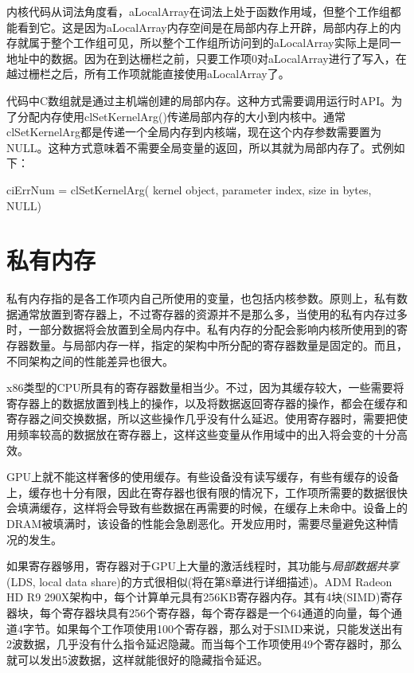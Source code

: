 内核代码从词法角度看，aLocalArray在词法上处于函数作用域，但整个工作组都能看到它。这是因为aLocalArray内存空间是在局部内存上开辟，局部内存上的内存就属于整个工作组可见，所以整个工作组所访问到的aLocalArray实际上是同一地址中的数据。因为在到达栅栏之前，只要工作项0对aLocalArray进行了写入，在越过栅栏之后，所有工作项就能直接使用aLocalArray了。

代码中C数组就是通过主机端创建的局部内存。这种方式需要调用运行时API。为了分配内存使用clSetKernelArg()传递局部内存的大小到内核中。通常clSetKernelArg都是传递一个全局内存到内核端，现在这个内存参数需要置为NULL。这种方式意味着不需要全局变量的返回，所以其就为局部内存了。式例如下：

\begin{codebox}[cpp]
ciErrNum = clSetKernelArg(
  kernel object,
  parameter index,
  size in bytes,
  NULL)
\end{codebox}



\section{私有内存}

私有内存指的是各工作项内自己所使用的变量，也包括内核参数。原则上，私有数据通常放置到寄存器上，不过寄存器的资源并不是那么多，当使用的私有内存过多时，一部分数据将会放置到全局内存中。私有内存的分配会影响内核所使用到的寄存器数量。与局部内存一样，指定的架构中所分配的寄存器数量是固定的。而且，不同架构之间的性能差异也很大。

x86类型的CPU所具有的寄存器数量相当少。不过，因为其缓存较大，一些需要将寄存器上的数据放置到栈上的操作，以及将数据返回寄存器的操作，都会在缓存和寄存器之间交换数据，所以这些操作几乎没有什么延迟。使用寄存器时，需要把使用频率较高的数据放在寄存器上，这样这些变量从作用域中的出入将会变的十分高效。

GPU上就不能这样奢侈的使用缓存。有些设备没有读写缓存，有些有缓存的设备上，缓存也十分有限，因此在寄存器也很有限的情况下，工作项所需要的数据很快会填满缓存，这样将会导致有些数据在再需要的时候，在缓存上未命中。设备上的DRAM被填满时，该设备的性能会急剧恶化。开发应用时，需要尽量避免这种情况的发生。

如果寄存器够用，寄存器对于GPU上大量的激活线程时，其功能与\emph{局部数据共享}(LDS, local data share)的方式很相似(将在第8章进行详细描述)。ADM Radeon HD R9 290X架构中，每个计算单元具有256KB寄存器内存。其有4块(SIMD)寄存器块，每个寄存器块具有256个寄存器，每个寄存器是一个64通道的向量，每个通道4字节。如果每个工作项使用100个寄存器，那么对于SIMD来说，只能发送出有2波数据，几乎没有什么指令延迟隐藏。而当每个工作项使用49个寄存器时，那么就可以发出5波数据，这样就能很好的隐藏指令延迟。

